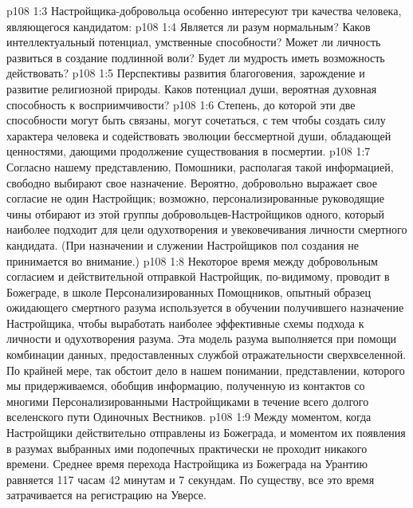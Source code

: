 \vs p108 1:3 Настройщика\hyp{}добровольца особенно интересуют три качества человека, являющегося кандидатом:
\vs p108 1:4 \bibnobreakspace {} Является ли разум нормальным? Каков интеллектуальный потенциал, умственные способности? Может ли личность развиться в создание подлинной воли? Будет ли мудрость иметь возможность действовать?
\vs p108 1:5 \pc {}\bibnobreakspace {} Перспективы развития благоговения, зарождение и развитие религиозной природы. Каков потенциал души, вероятная духовная способность к восприимчивости?
\vs p108 1:6 \pc {}\bibnobreakspace {} Степень, до которой эти две способности могут быть связаны, могут сочетаться, с тем чтобы создать силу характера человека и содействовать эволюции бессмертной души, обладающей ценностями, дающими продолжение существования в посмертии.
\vs p108 1:7 \pc Согласно нашему представлению, Помошники, располагая такой информацией, свободно выбирают свое назначение. Вероятно, добровольно выражает свое согласие не один Настройщик; возможно, персонализированные руководящие чины отбирают из этой группы добровольцев\hyp{}Настройщиков одного, который наиболее подходит для цели одухотворения и увековечивания личности смертного кандидата. (При назначении и служении Настройщиков пол создания не принимается во внимание.)
\vs p108 1:8 Некоторое время между добровольным согласием и действительной отправкой Настройщик, по\hyp{}видимому, проводит в Божеграде, в школе Персонализированных Помощников, опытный образец ожидающего смертного разума используется в обучении получившего назначение Настройщика, чтобы выработать наиболее эффективные схемы подхода к личности и одухотворения разума. Эта модель разума выполняется при помощи комбинации данных, предоставленных службой отражательности сверхвселенной. По крайней мере, так обстоит дело в нашем понимании, представлении, которого мы придерживаемся, обобщив информацию, полученную из контактов со многими Персонализированными Настройщиками в течение всего долгого вселенского пути Одиночных Вестников.
\vs p108 1:9 Между моментом, когда Настройщики действительно отправлены из Божеграда, и моментом их появления в разумах выбранных ими подопечных практически не проходит никакого времени. Среднее время перехода Настройщика из Божеграда на Урантию равняется 117 часам 42 минутам и 7 секундам. По существу, все это время затрачивается на регистрацию на Уверсе.
